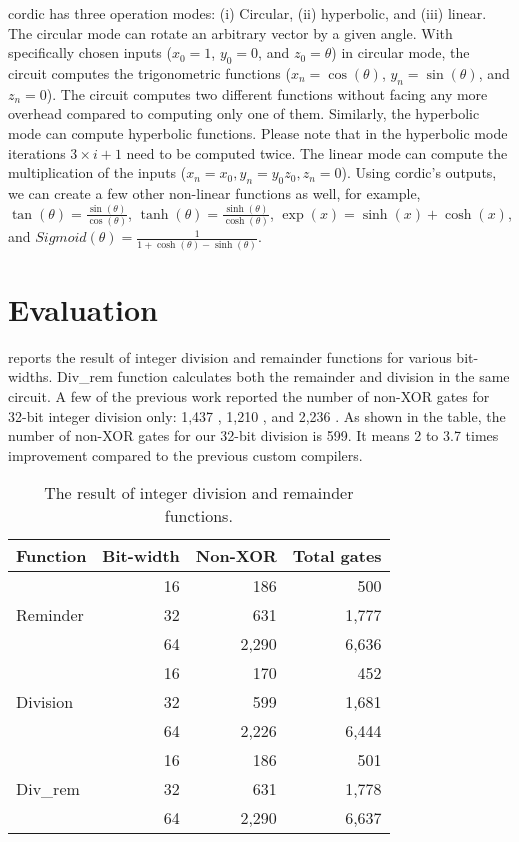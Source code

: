 \acrshort{cordic} has three operation modes:
(i) Circular, (ii) hyperbolic, and (iii) linear.
The circular mode can rotate an arbitrary vector by a given angle.
With specifically chosen inputs ($x_0=1$, $y_0=0$, and $z_0=\theta$) in circular mode, the circuit computes the trigonometric functions ($x_n=\cos(\theta)$, $y_n=\sin(\theta)$, and $z_n=0$).
The circuit computes two different functions without facing any more overhead compared to computing only one of them.
Similarly, the hyperbolic mode can compute hyperbolic functions.
Please note that in the hyperbolic mode iterations $3\times i+1$ need to be computed twice.
The linear mode can compute the multiplication of the inputs ($x_n=x_0, y_n=y_0z_0, z_n=0$).
Using \acrshort{cordic}'s outputs, we can create a few other non-linear functions as well, for example,
$\tan(\theta)=\frac{\sin(\theta)}{\cos(\theta)}$,
$\tanh(\theta)=\frac{\sinh(\theta)}{\cosh(\theta)}$,
$\exp(x)=\sinh (x) + \cosh (x)$, and
$Sigmoid(\theta)=\frac{1}{1+\cosh(\theta)-\sinh(\theta)}$.

\section{Evaluation}
 reports the result of integer division and remainder functions for various bit-widths.
Div\_rem function calculates both the remainder and division in the same circuit.
A few of the previous work reported the number of non-XOR gates for 32-bit integer division only: 1,437 \cite{mood2016frigate}, 1,210 \cite{zahur2015obliv}, and 2,236 \cite{liu2015oblivm}.
As shown in the table, the number of non-XOR gates for our 32-bit division is 599.
It means 2 to 3.7 times improvement compared to the previous custom compilers.

\begin{table}
\center
\caption{The result of integer division and remainder functions.}\label{table:div}
\begin{tabular}{l||r||r|r}
	Function                  & \multicolumn{1}{c|}{Bit-width} & \multicolumn{1}{c|}{Non-XOR} & \multicolumn{1}{c}{Total gates} \\ \hline \hline
\multirow{3}{*}{Reminder} & 16        & 186     & 500         \\
                          & 32        & 631     & 1,777       \\
                          & 64        & 2,290   & 6,636       \\ \hline \hline
\multirow{3}{*}{Division} & 16        & 170     & 452         \\
                          & 32        & 599     & 1,681       \\
                          & 64        & 2,226   & 6,444       \\ \hline \hline
\multirow{3}{*}{Div\_rem} & 16        & 186     & 501         \\
                          & 32        & 631     & 1,778       \\
                          & 64        & 2,290   & 6,637
\end{tabular}
\end{table}

